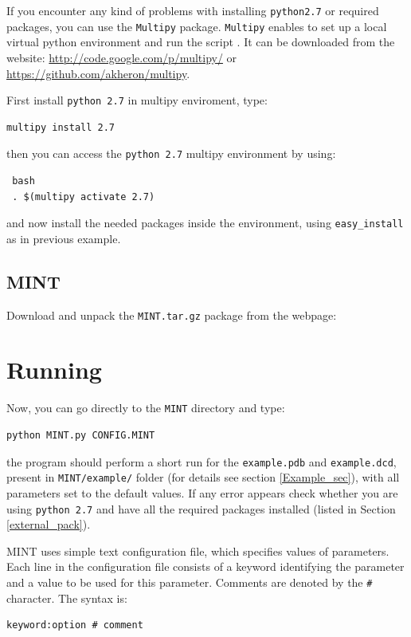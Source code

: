 \documentclass[12pt]{article}
\begin{document}
If you encounter any kind of problems with installing  {\tt python2.7} or required packages, you can use the \texttt{Multipy} package. \texttt{Multipy} enables to set up a local virtual python environment and run the script . It can be downloaded from the website: \url{http://code.google.com/p/multipy/} or \url{https://github.com/akheron/multipy}. 

First install {\tt python 2.7} in multipy enviroment, type:
\begin{verbatim}
multipy install 2.7
\end{verbatim}
then you can access the  {\tt python 2.7} multipy environment  by using:
\begin{verbatim}
 bash
 . $(multipy activate 2.7)
\end{verbatim}
and now install the needed packages inside the environment, using  {\tt easy\_install} as in previous example.

\subsection{MINT}
Download and unpack the \texttt{MINT.tar.gz} package from the webpage:
\\

\section{Running}
Now, you can go directly to the \texttt{MINT} directory and type:
\begin{verbatim}
python MINT.py CONFIG.MINT
\end{verbatim}
the program should perform a short run for the \texttt{example.pdb} and \texttt{example.dcd}, present in \texttt{MINT/example/} folder (for details see section \ref{Example_sec}), with all parameters set to the default values. If any error appears check whether you are using {\tt python 2.7} and have all the required packages installed (listed in Section \ref{external_pack}).

MINT uses simple text configuration file, which specifies values of parameters. Each line in the configuration file consists of a keyword identifying the parameter and a value to be used for this parameter. Comments are denoted by the \texttt{\#} character. The syntax is:
\begin{verbatim}
keyword:option # comment
\end{verbatim}
\end{document}
